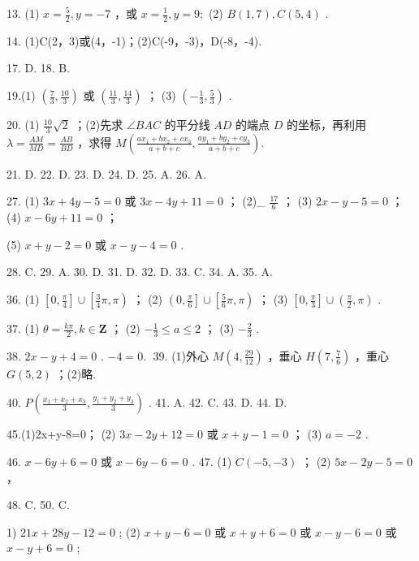 \documentclass[10pt]{article}
\begin{document}
13. (1) \(x = \frac{5}{2},y =  - 7\) ，或 \(x = \frac{1}{2},y = 9;\) (2) \(B\left( {1,7}\right) ,C\left( {5,4}\right)\) .

14. (1)C(2，3)或(4，-1)；(2)C(-9，-3)，D(-8，-4).

17. D. 18. B.

19.(1) \(\left( {\frac{7}{3},\frac{10}{3}}\right)\) 或 \(\left( {\frac{11}{3},\frac{14}{3}}\right)\) ； (3) \(\left( {-\frac{1}{3},\frac{5}{3}}\right)\) .

20. (1) \(\frac{10}{3}\sqrt{2}\) ；(2)先求 \(\angle {BAC}\) 的平分线 \({AD}\) 的端点 \(D\) 的坐标，再利用 \(\lambda  = \frac{AM}{MD} = \frac{AB}{BD}\) ，求得 \(M\left( {\frac{a{x}_{1} + b{x}_{2} + c{x}_{3}}{a + b + c},\frac{a{y}_{1} + b{y}_{2} + c{y}_{3}}{a + b + c}}\right) .\)

21. D. 22. D. 23. D. 24. D. 25. A. 26. A.

27. (1) \({3x} + {4y} - 5 = 0\) 或 \({3x} - {4y} + {11} = 0\) ； (2)\_ \(\frac{17}{6}\) ； (3) \({2x} - y - 5 = 0\) ； (4) \(x - {6y} + {11} = 0\) ；

(5) \(x + y - 2 = 0\) 或 \(x - y - 4 = 0\) .

28. C. 29. A. 30. D. 31. D. 32. D. 33. C. 34. A. 35. A.

36. (1) \(\left\lbrack  {0,\frac{\pi }{4}}\right\rbrack   \cup  \left\lbrack  {\frac{3}{4}\pi ,\pi }\right)\) ； (2) \(\left( {0,\frac{\pi }{6}}\right\rbrack   \cup  \left\lbrack  {\frac{5}{6}\pi ,\pi }\right)\) ； (3) \(\left\lbrack  {0,\frac{\pi }{3}}\right\rbrack   \cup  \left( {\frac{\pi }{2},\pi }\right)\) .

37. (1) \(\theta  = \frac{k\pi }{2},k \in  \mathbf{Z}\) ； (2) \(- \frac{1}{3} \leq  a \leq  2\) ； (3) \(- \frac{2}{3}\) .

38. \({2x} - y + 4 = 0\) . \(- 4 = 0.\;\) 39. (1)外心 \(M\left( {4,\frac{29}{12}}\right)\) ，垂心 \(H\left( {7,\frac{7}{6}}\right)\) ，重心 \(G\left( {5,2}\right)\) ；(2)略.

40. \(P\left( {\frac{{x}_{1} + {x}_{2} + {x}_{3}}{3},\frac{{y}_{1} + {y}_{2} + {y}_{3}}{3}}\right)\) . 41. A. 42. C. 43. D. 44. D.

45.(1)2x+y-8=0； (2) \({3x} - {2y} + {12} = 0\) 或 \(x + y - 1 = 0\) ； (3) \(a =  - 2\) .

46. \(x - {6y} + 6 = 0\) 或 \(x - {6y} - 6 = 0\) . 47. (1) \(C\left( {-5, - 3}\right)\) ； (2) \({5x} - {2y} - 5 = 0\) ，

48. C. 50. C.

1) \({21x} + {28y} - {12} = 0\) ; (2) \(x + y - 6 = 0\) 或 \(x + y + 6 = 0\) 或 \(x - y - 6 = 0\) 或 \(x - y + 6 = 0\) ;
\end{document}
